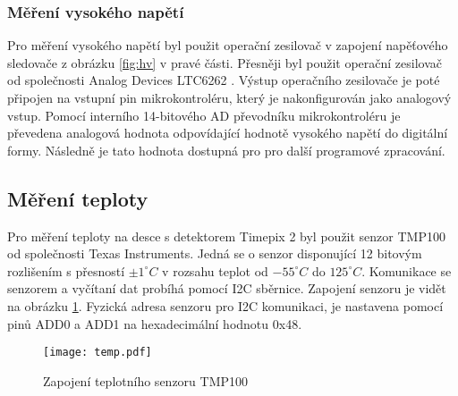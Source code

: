 	\subsubsection{Měření vysokého napětí} %
	Pro měření vysokého napětí byl použit operační zesilovač v zapojení napěťového sledovače z obrázku \ref{fig:hv} v pravé části. Přesněji byl použit operační zesilovač od společnosti Analog Devices LTC6262 \cite{LTC6252}. Výstup operačního zesilovače je poté připojen na vstupní pin mikrokontroléru, který je nakonfigurován jako analogový vstup. Pomocí interního 14-bitového AD převodníku mikrokontroléru je převedena analogová hodnota odpovídající hodnotě vysokého napětí do digitální formy. Následně je tato hodnota dostupná pro pro další programové zpracování. 

	\subsection{Měření teploty}	%
	\label{Mereni teploty}
	Pro měření teploty na desce s detektorem Timepix 2 byl použit senzor TMP100 \cite{TMP100} od společnosti Texas Instruments. Jedná se o senzor disponující 12 bitovým rozlišením s přesností $\pm 1^{\circ} C$ v rozsahu teplot od $-55^{\circ}C$ do $125^{\circ}C$. Komunikace se senzorem a vyčítaní dat probíhá pomocí I2C sběrnice. Zapojení senzoru je vidět na obrázku \ref{fig:tmp100}. Fyzická adresa senzoru pro I2C komunikaci, je nastavena pomocí pinů ADD0 a ADD1 na hexadecimální hodnotu 0x48.
	\begin{figure}[h!]
		\centering
		\captionsetup{justification=centering}
		\texttt{[image: temp.pdf]}
		\caption{Zapojení teplotního senzoru TMP100} 
		\label{fig:tmp100}
	\end{figure} 
